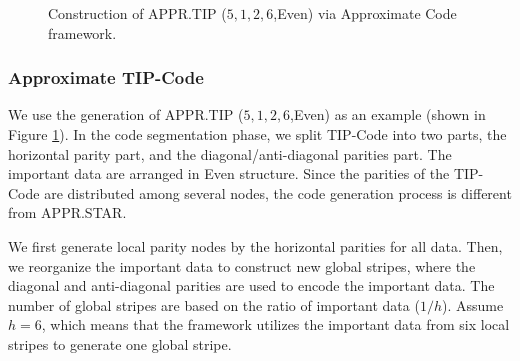 \documentclass[sigconf]{acmart}
\begin{document}
\begin{figure}[ht]
\caption{Construction of APPR.TIP ($5,1,2,6$,Even) via Approximate Code framework.}
\label{fig-ap-TIP}
\end{figure}

\subsubsection{Approximate TIP-Code}

We use the generation of APPR.TIP ($5,1,2,6$,Even) as an example (shown in Figure \ref{fig-ap-TIP}). In the code segmentation phase, we split TIP-Code into two parts, the horizontal parity part, and the diagonal/anti-diagonal parities part. The important data are arranged in Even structure. Since the parities of the TIP-Code are distributed among several nodes, the code generation process is different from APPR.STAR.

We first generate local parity nodes by the horizontal parities for all data. Then, we reorganize the important data to construct new global stripes, where the diagonal and anti-diagonal parities are used to encode the important data. The number of global stripes are based on the ratio of important data ($1/h$). Assume $h=6$, which means that the framework utilizes the important data from six local stripes to generate one global stripe.
\end{document}
